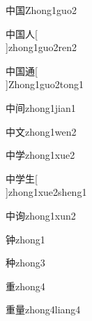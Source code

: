 \begin{verbete}[4;8]{中国}{Zhong1guo2}
\end{verbete}

\begin{verbete}[4;8;2]{中国人}[\\]{zhong1guo2ren2}
\end{verbete}

\begin{verbete}[4;8;10]{中国通}[\\]{Zhong1guo2tong1}
\end{verbete}

\begin{verbete}[4;7]{中间}{zhong1jian1}
\end{verbete}

\begin{verbete}[4;4]{中文}{zhong1wen2}
\end{verbete}

\begin{verbete}[4;8]{中学}{zhong1xue2}
\end{verbete}

\begin{verbete}[4;8;5]{中学生}[\\]{zhong1xue2sheng1}
\end{verbete}

\begin{verbete}[4;8]{中询}{zhong1xun2}
\end{verbete}

\begin{verbete}[9]{钟}{zhong1}
\end{verbete}

\begin{verbete}[9]{种}{zhong3}
\end{verbete}

\begin{verbete}[9]{重}{zhong4}
\end{verbete}

\begin{verbete}[8;12]{重量}{zhong4liang4}
\end{verbete}


